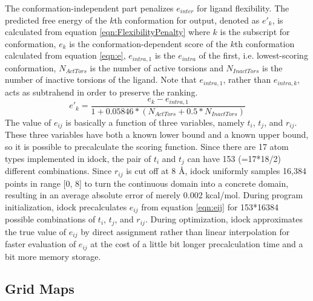 The conformation-independent part penalizes $e_{inter}$ for ligand flexibility. The predicted free energy of the $k$th conformation for output, denoted as $e'_k$, is calculated from equation \eqref{eqn:FlexibilityPenalty} where $k$ is the subscript for conformation, $e_k$ is the conformation-dependent score of the $k$th conformation calculated from equation \eqref{eqn:e}, $e_{intra,1}$ is the $e_{intra}$ of the first, i.e. lowest-scoring conformation, $N_{ActTors}$ is the number of active torsions and $N_{InactTors}$ is the number of inactive torsions of the ligand. Note that $e_{intra,1}$, rather than $e_{intra,k}$, acts as subtrahend in order to preserve the ranking.
\begin{equation}
\label{eqn:FlexibilityPenalty}
e'_k = \frac{e_k - e_{intra,1}}{1 + 0.05846 * (N_{ActTors} + 0.5 * N_{InactTors})}
\end{equation}
The value of $e_{ij}$ is basically a function of three variables, namely $t_i$, $t_j$, and $r_{ij}$. These three variables have both a known lower bound and a known upper bound, so it is possible to precalculate the scoring function. Since there are 17 atom types implemented in idock, the pair of $t_i$ and $t_j$ can have 153 (=17*18/2) different combinations. Since $r_{ij}$ is cut off at 8 \AA, idock uniformly samples 16,384 points in range [0, 8] to turn the continuous domain into a concrete domain, resulting in an average absolute error of merely 0.002 kcal/mol. During program initialization, idock precalculates $e_{ij}$ from equation \eqref{eqn:eij} for 153*16384 possible combinations of $t_i$, $t_j$, and $r_{ij}$. During optimization, idock approximates the true value of $e_{ij}$ by direct assignment rather than linear interpolation for faster evaluation of $e_{ij}$ at the cost of a little bit longer precalculation time and a bit more memory storage.

\subsection{Grid Maps}

